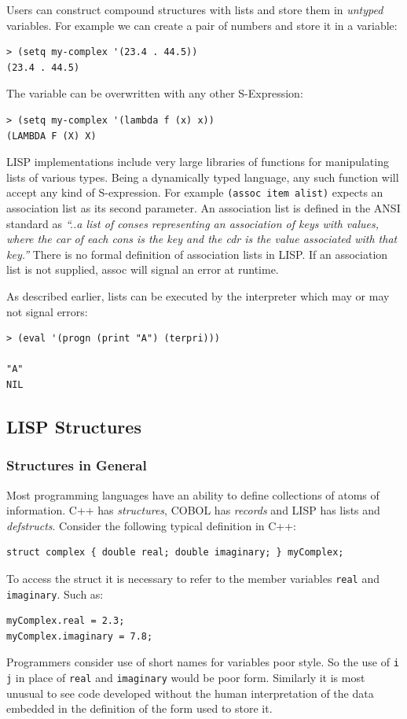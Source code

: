 \documentclass[a4paper,12pt,dvips]{article}
\begin{document}
Users can construct compound structures with lists and store them in \emph{untyped} variables. For example we can create a pair of numbers and store it in a variable:
\begin{verbatim}
> (setq my-complex '(23.4 . 44.5)) 
(23.4 . 44.5)
\end{verbatim}
The variable can be overwritten with any other S-Expression:
\begin{verbatim}
> (setq my-complex '(lambda f (x) x)) 
(LAMBDA F (X) X)
\end{verbatim}
LISP implementations include very large libraries of functions for manipulating lists of various types. Being a dynamically typed language, any such function will accept any kind of S-expression. For example \texttt{(assoc item alist)} expects an association list as its second parameter. An association list is defined in the ANSI standard as \textit{``..a list of conses representing an association of keys with values, where the car of each cons is the key and the cdr is the value associated with that key.''} There is no formal definition of association lists in LISP. If an association list is not supplied, assoc will signal an error at runtime. 

As described earlier, lists can be executed by the interpreter which may or may not signal errors:
\begin{verbatim}
> (eval '(progn (print "A") (terpri))) 

"A"
NIL
\end{verbatim}

\subsection{LISP Structures}
\subsubsection{Structures in General}
Most programming languages have an ability to define collections of atoms of information.  C++ has \emph{structures}, COBOL has \emph{records} and LISP has lists and \emph{defstructs}. Consider the following typical definition in C++:
\begin{verbatim}
struct complex { double real; double imaginary; } myComplex;
\end{verbatim}
To access the struct it is necessary to refer to the member variables \texttt{real} and \texttt{imaginary}. Such as:
\begin{verbatim}
myComplex.real = 2.3;
myComplex.imaginary = 7.8;
\end{verbatim}
Programmers consider use of short names for variables poor style. So the use of \texttt{i} \texttt{j} in place of \texttt{real} and \texttt{imaginary} would be poor form. Similarly it is most unusual to see code developed without the human interpretation of the data embedded in the definition of the form used to store it.  
\end{document}
